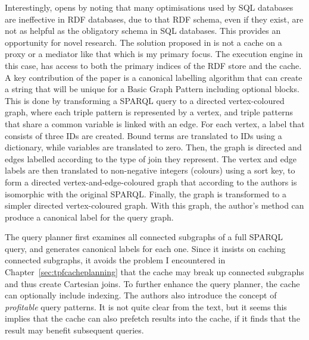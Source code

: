 Interestingly, \cite{papailiou2015graph} opens by noting that many
optimisations used by SQL databases are ineffective in RDF databases,
due to that RDF schema, even if they exist, are not as helpful as the
obligatory schema in SQL databases. This provides an opportunity for
novel research. The solution proposed in \cite{papailiou2015graph}  is not a cache on
a proxy or a mediator like that which is my primary focus. The execution engine
in this case, has access to both the primary indices of the RDF store
and the cache. A key contribution of the paper is a canonical
labelling algorithm that can create a string that will be unique for a
Basic Graph Pattern including optional blocks. This is done by
transforming a SPARQL query to a directed vertex-coloured graph, where
each triple pattern is represented by a vertex, and triple patterns
that share a common variable is linked with an edge. For each vertex,
a label that consists of three IDs are created. Bound terms are
translated to IDs using a dictionary, while variables are translated
to zero. Then, the graph is directed and edges labelled according to
the type of join they represent. The vertex and edge labels are then
translated to non-negative integers (colours) using a sort key, to
form a directed vertex-and-edge-coloured graph that according to the
authors is isomorphic with the original SPARQL. Finally, the graph is
transformed to a simpler directed vertex-coloured graph. With this
graph, the author's method can produce a canonical label for the query
graph.

The query planner first examines all connected subgraphs of a full
SPARQL query, and generates canonical labels for each one. Since it
insists on caching connected subgraphs, it avoids the problem I
encountered in Chapter~\ref{sec:tpfcacheplanning} that the cache may
break up connected subgraphs and thus create Cartesian joins. To
further enhance the query planner, the cache can optionally include
indexing. The authors also introduce the concept of
\textit{profitable} query patterns. It is not quite clear from the
text, but it seems this implies that the cache can also prefetch
results into the cache, if it finds that the result may benefit
subsequent queries.


